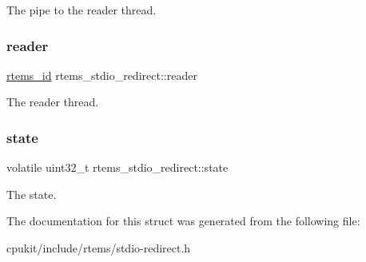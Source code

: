 The pipe to the reader thread. \mbox{\label{structrtems__stdio__redirect_aaf03aea48f69d68bd632e60041160bb5}} 
\subsubsection{\texorpdfstring{reader}{reader}}
{\footnotesize\ttfamily \mbox{\hyperlink{group__ClassicTasks_gab20892b814dced7dd4e5b9bf42becd57}{rtems\+\_\+id}} rtems\+\_\+stdio\+\_\+redirect\+::reader}

The reader thread. \mbox{\label{structrtems__stdio__redirect_a5deea9ef4c0317f6676b1c501bb7b411}} 
\subsubsection{\texorpdfstring{state}{state}}
{\footnotesize\ttfamily volatile uint32\+\_\+t rtems\+\_\+stdio\+\_\+redirect\+::state}

The state. 

The documentation for this struct was generated from the following file\+:\begin{DoxyCompactItemize}
\item 
cpukit/include/rtems/stdio-\/redirect.\+h\end{DoxyCompactItemize}
